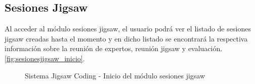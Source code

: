 \subsection{Sesiones Jigsaw}
Al acceder al módulo sesiones jigsaw, el usuario podrá ver el listado de sesiones jigsaw creadas hasta el momento y en dicho listado se encontrará la respectiva información sobre la reunión de expertos, reunión jigsaw y evaluación. \autoref{fig:sesionesjigsaw_inicio}.

\begin{figure}
\centering
\caption{Sistema Jigsaw Coding - Inicio del módulo sesiones jigsaw}
\label{fig:sesionesjigsaw_inicio}
\end{figure}
